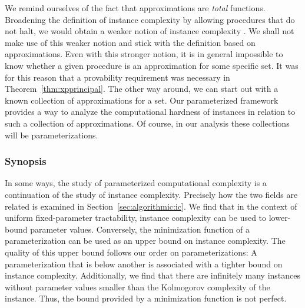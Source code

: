 We remind ourselves of the fact that approximations are \emph{total} functions.
Broadening the definition of instance complexity by allowing procedures that do not halt, we would obtain a weaker notion of instance complexity \parencite{kummer1996kolmogorov}.
We shall not make use of this weaker notion and stick with the definition based on approximations.
Even with this stronger notion, it is in general impossible to know whether a given procedure is an approximation for some specific set.
It was for this reason that a provability requirement was necessary in Theorem~\ref{thm:xpprincipal}.
The other way around, we can start out with a known collection of approximations for a set.
Our parameterized framework provides a way to analyze the computational hardness of instances in relation to such a collection of approximations.
Of course, in our analysis these collections will be parameterizations.

\subsubsection{Synopsis}
In some ways, the study of parameterized computational complexity is a continuation of the study of instance complexity.
Precisely how the two fields are related is examined in Section~\ref{sec:algorithmic:ic}.
We find that in the context of uniform fixed-parameter tractability, instance complexity can be used to lower-bound parameter values.
Conversely, the minimization function of a parameterization can be used as an upper bound on instance complexity.
The quality of this upper bound follows our order on parameterizations:
A parameterization that is below another is associated with a tighter bound on instance complexity.
Additionally, we find that there are infinitely many instances without parameter values smaller than the Kolmogorov complexity of the instance.
Thus, the bound provided by a minimization function is not perfect.

